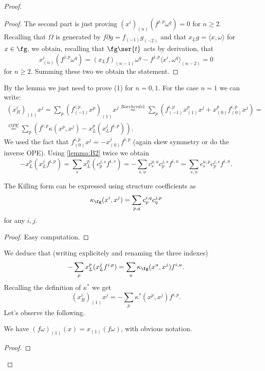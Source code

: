 \documentclass[a4paper, 10pt]{article}
\begin{document}
\begin{proof}
\begin{proof}
                    The second part is just proving $(x^i)_{(n)}(f^{j, p}\omega^q) = 0$ for $n \geq 2$. Recalling that $\Omega$ is generated by $f\partial g = f_{(-1)}g_{(-2)}$ and that $x_Lg = \langle x, \omega \rangle$ for $x \in \fg$, we obtain, recalling that $\fg\ser{t}$ acts by derivation, that \[x^i_{(n)}(f^{j,p}\omega^q) = (x_Lf)_{(n-1)}\omega^q - f^{j,p}\langle x^i, \omega^q \rangle_{(n-2)} = 0 \] for $n \geq 2$. Summing these two we obtain the statement.
                \end{proof}
                By the lemma we just need to prove (1) for $n = 0, 1$.
                For the case $n = 1$ we can write:
                \begin{gather}
                    (x^i_R)_{(1)}x^j = \sum_p (f^{i,p}_{(-1)}x^p)_{(1)}x^j \stackrel{Borcherds 1}{=} \sum_p (f^{i,p}_{(-1)}x^p_{(1)}x^j + x^p_{(0)}f^{i,p}_{(0)}x^j) = \\
                    \stackrel{OPE}{=} \sum_p (f^{i,p}\kappa(x^p, x^j) - x^p_L(x^j_Lf^{i,p})).
                \end{gather}
                We used the fact that $f^{i,p}_{(0)}x^j = - x^j_{(0)}f^{i, p}$ (again skew symmetry or do the inverse OPE).
                Using \cref{lemma:B2} twice we obtain \[-x^p_L(x^j_Lf^{i, p}) = \sum_s x^p_L(c^{j,s}_pf^{i,s}) = -\sum_{s, u} c^{p,u}_sc^{j,s}_pf^{i,u} = \sum_{s, u}c^{u,p}_sc^{j,s}_pf^{i, u}. \] 
                \begin{lemma}
                    The Killing form can be expressed using structure coefficients as \[\kappa_{\fg}(x^i, x^j) = \sum_{p,q} c^{i,q}_pc^{j,p}_q  \] for any $i, j$.
                \end{lemma}
                \begin{proof}
                    Easy computation.
                \end{proof}
                We deduce that (writing explicitely and renaming the three indexes)
                \begin{gather}
                    -\sum_p x^p_L(x^j_L f^{i,p}) = \sum_u \kappa_{\fg}(x^u, x^j)f^{i,u}.
                \end{gather}
                Recalling the definition of $\kappa^*$ we get \[(x^i_R)_{(1)}x^j = -\sum_p \kappa^*(x^p, x^j)f^{i, p}. \]  Let's observe the following.
                \begin{lemma}
                    We have $(f\omega)_{(1)}(x) = x_{(1)}(f\omega)$, with obvious notation.
                \end{lemma}
                \begin{proof}

\end{proof}
\end{proof}
\end{document}
